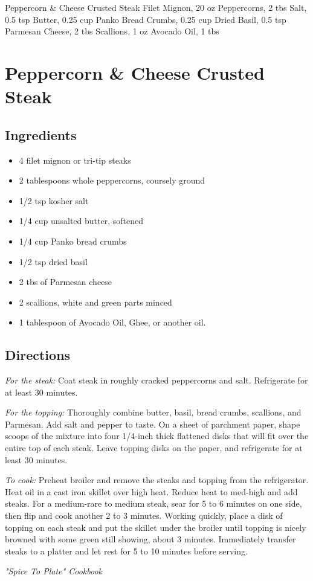 Peppercorn & Cheese Crusted Steak
  Filet Mignon, 20 oz
  Peppercorns, 2 tbs
  Salt, 0.5 tsp
  Butter, 0.25 cup
  Panko Bread Crumbs, 0.25 cup
  Dried Basil, 0.5 tsp
  Parmesan Cheese, 2 tbs
  Scallions, 1 oz
  Avocado Oil, 1 tbs

\section{ Peppercorn \& Cheese Crusted Steak }

\subsection{ Ingredients }

\begin{itemize}
  \item 4 filet mignon or tri-tip steaks
  \item 2 tablespoons whole peppercorns, coursely ground
  \item 1/2 tsp kosher salt
  \item 1/4 cup unsalted butter, softened
  \item 1/4 cup Panko bread crumbs
  \item 1/2 tsp dried basil
  \item 2 tbs of Parmesan cheese
  \item 2 scallions, white and green parts minced
  \item 1 tablespoon of Avocado Oil, Ghee, or another oil. 
\end{itemize}

\subsection{ Directions }

\textit{For the steak:} Coat steak in roughly cracked peppercorns and salt. Refrigerate for at least 30 minutes. 

\textit{For the topping:} Thoroughly combine butter, basil, bread crumbs, scallions, and Parmesan. Add salt and pepper to taste. On a sheet of parchment paper, shape scoops of the mixture into four 1/4-inch thick flattened disks that will fit over the entire top of each steak. Leave topping disks on the paper, and refrigerate for at least 30 minutes. 

\textit{To cook:} Preheat broiler and remove the steaks and topping from the refrigerator. Heat oil in a cast iron skillet over high heat. Reduce heat to med-high and add steaks. For a medium-rare to medium steak, sear for 5 to 6 minutes on one side, then flip and cook another 2 to 3 minutes. Working quickly, place a disk of topping on each steak and put the skillet under the broiler until topping is nicely browned with some green still showing, about 3 minutes. Immediately transfer steaks to a platter and let rest for 5 to 10 minutes before serving. 

\textit{"Spice To Plate" Cookbook}
